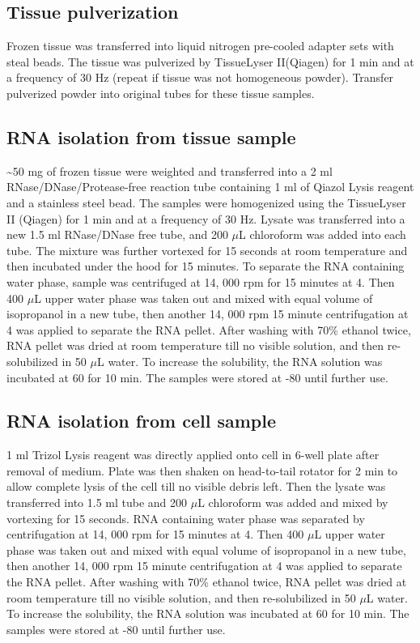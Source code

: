 \subsection{Tissue pulverization}
Frozen tissue was transferred into liquid nitrogen pre-cooled adapter sets with steal beads. The tissue was pulverized by TissueLyser II\texttrademark(Qiagen) for 1 min and at a frequency of 30 Hz (repeat if tissue was not homogeneous powder). Transfer pulverized powder into original tubes for these tissue samples.

\subsection{RNA isolation from tissue sample}
\textasciitilde50 mg of frozen tissue were weighted and transferred into a 2 ml RNase/DNase/Protease-free reaction tube containing 1 ml of Qiazol{\texttrademark} Lysis reagent and a stainless steel bead. The samples were homogenized using the TissueLyser II{\texttrademark} (Qiagen) for 1 min and at a frequency of 30 Hz. Lysate was transferred into a new 1.5 ml RNase/DNase free tube, and 200 $\mu$L chloroform was added into each tube. The mixture was further vortexed for 15 seconds at room temperature and then incubated under the hood for 15 minutes. To separate the RNA containing water phase, sample was centrifuged at 14, 000 rpm for 15 minutes at 4{\celsius}. Then 400 $\mu$L upper water phase was taken out and mixed with equal volume of isopropanol in a new tube, then another 14, 000 rpm 15 minute centrifugation at 4{\celsius} was applied to separate the RNA pellet. After washing with 70\% ethanol twice, RNA pellet was dried at room temperature till no visible solution, and then re-solubilized in 50 $\mu$L water. To increase the solubility, the RNA solution was incubated at 60{\celsius} for 10 min. The samples were stored at -80{\celsius} until further use.

\subsection{RNA isolation from cell sample}\label{sec:sec423}
1 ml Trizol{\texttrademark} Lysis reagent was directly applied onto cell in 6-well plate after removal of medium. Plate was then shaken on head-to-tail rotator for 2 min to allow complete lysis of the cell till no visible debris left. Then the lysate was transferred into 1.5 ml tube and 200 $\mu$L chloroform was added and mixed by vortexing for 15 seconds. RNA containing water phase was separated by centrifugation at 14, 000 rpm for 15 minutes at 4{\celsius}. Then 400 $\mu$L upper water phase was taken out and mixed with equal volume of isopropanol in a new tube, then another 14, 000 rpm 15 minute centrifugation at 4{\celsius} was applied to separate the RNA pellet. After washing with 70\% ethanol twice, RNA pellet was dried at room temperature till no visible solution, and then re-solubilized in 50 $\mu$L water. To increase the solubility, the RNA solution was incubated at 60{\celsius} for 10 min. The samples were stored at -80{\celsius} until further use.

